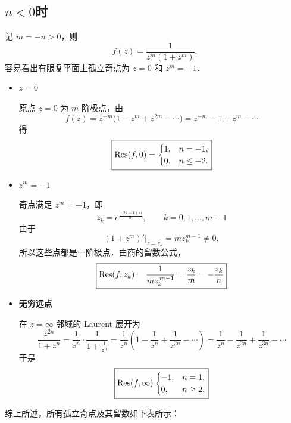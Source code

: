 \documentclass[12pt, a4paper, oneside, UTF8]{ctexbook}
\begin{document}
\begin{solution}
    \subsection*{$n<0$时}
    记 $m=-n>0$，则
    \[
    f(z)=\frac{1}{z^m(1+z^m)}.
    \]
    容易看出有限复平面上孤立奇点为 $z=0$ 和 $z^m=-1$．
    \begin{itemize}
        \item \textbf{$z=0$}
            
            原点 $z=0$ 为 $m$ 阶极点，由
            \[
            f(z)=z^{-m}\bigl(1-z^m+z^{2m}-\cdots\bigr)
            =z^{-m}-1+z^m-\cdots
            \]
            得
            \[\boxed{
            \Res(f,0)=
            \begin{cases}
            1,&n=-1,\\
            0,&n\le -2.
            \end{cases}
            }\]
        \item \textbf{$z^m=-1$}
            
            奇点满足 $z^m=-1$，即
            \[
            z_k=e^{\frac{(2k+1)\pi i}{m}}, \qquad k=0,1,\ldots,m-1
            \]
            由于
            \[ \left.(1+z^m)'\right|_{z=z_k} =mz_k^{m-1}\ne0, \]
            所以这些点都是一阶极点．由商的留数公式，
            \[\boxed{
            \Res(f,z_k)=\frac{1}{mz_k^{\,m-1}}
            =\frac{z_k}{m}
            =-\frac{z_k}{n}
            }\]
        \item \textbf{无穷远点}
            
            在 $z=\infty$ 邻域的 Laurent 展开为
            \[ \frac{z^{2n}}{1+z^n} = \frac{1}{z^n} \cdot \frac{1}{1+\frac{1}{z^n}} = \frac{1}{z^n} \left(1 - \frac{1}{z^n} + \frac{1}{z^{2n}} - \cdots \right) = \frac{1}{z^n} - \frac{1}{z^{2n}} + \frac{1}{z^{3n}} - \cdots \]
            于是
            \[\boxed{\Res(f,\infty)\begin{cases}
                -1, & n=1, \\
                0, & n\ge2.
            \end{cases}}\]
    \end{itemize}
    综上所述，所有孤立奇点及其留数如下表所示：


\end{solution}
\end{document}
